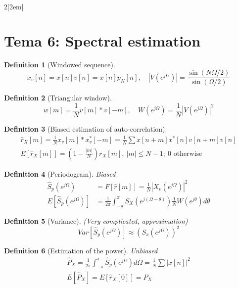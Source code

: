 \documentclass{myclass}
\newtheorem*{definition}{Definition}
\begin{document}
\begin{multicols}{2}[\columnsep2em]
\section{Tema 6: Spectral estimation}
\begin{definition}[Windowed sequence] 
  \[
  x_v[n]=x[n]v[n]=x[n]p_N[n], \quad |V(e^{j\Omega})|=\frac{\sin(N\Omega / 2)}{\sin(\Omega  / 2)}
  \] 
\end{definition}

\begin{definition}[Triangular window] 
  \[
    w[m]=\frac{1}{N}v[m]*v[-m] , \quad W(e^{j\Omega})=\frac{1}{N}\left|V(e^{j\Omega})\right|^2 
  \] 
\end{definition}

\begin{definition}[Biased estimation of auto-correlation]
  \begin{align*}
  \hat{r}_X[m] = \frac{1}{N} x_v[m]\ast x_v^*[-m] = \frac{1}{N}\sum x[n+m]x^*[n]v[n+m]v[n]\\
  E[\hat{r}_X[m]] = \left( 1-\frac{|m|}{N} \right) r_X[m],\ |m|\le N-1; \ 0 \text{ otherwise} 
  \end{align*}
\end{definition}



\begin{definition}[Periodogram] Biased
  \begin{align*}
	\hat{S}_p(e^{j\Omega })&=F[\hat{r}[m]]=\frac{1}{N}|X_v(e^{j\Omega })|^2 \\
	E[\hat{S}_p(e^{j\Omega })] &= \frac{1}{2\pi}\int_{-\pi}^{\pi}S_X(e^{j(\Omega-\theta )})\frac{1}{N}W(e^{j\theta })d\theta 
  \end{align*}
\end{definition}

\begin{definition}[Variance] (Very complicated, approximation)
\[
Var[\hat{S}_p(e^{j\Omega})]\approx (S_x(e^{j\Omega}))^2
\] 
\end{definition}

\begin{definition}[Estimation of the power] Unbiased
  \begin{align*}
    \hat{P}_X = \frac{1}{2\pi}\int_{-\pi}^{\pi} \hat{S}_p(e^{j\Omega})d\Omega = \frac{1}{N}\sum|x[n]|^2 \\
	E[\hat{P}_{X}] = E[\hat{r}_X[0]]=P_X
  \end{align*}
\end{definition}


\end{multicols}
\end{document}

